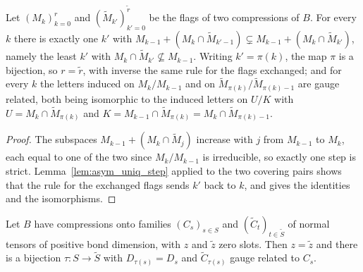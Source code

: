 \begin{lemma}
    \label{prop:asym_uniq_matching}
    \leanok
    Let $(M_k)_{k=0}^r$ and $(\widetilde M_{k'})_{k'=0}^{\widetilde r}$ be the flags of two
    compressions of $B$. For every $k$ there is exactly one $k'$ with
    $M_{k-1}+(M_k\cap\widetilde M_{k'-1})\subsetneq M_{k-1}+(M_k\cap\widetilde M_{k'})$, namely the least
    $k'$ with $M_k\cap\widetilde M_{k'}\not\subseteq M_{k-1}$. Writing $k'=\pi(k)$, the map $\pi$ is a
    bijection, so $r=\widetilde r$, with inverse the same rule for the flags exchanged; and for
    every $k$ the letters induced on $M_k/M_{k-1}$ and on $\widetilde M_{\pi(k)}/\widetilde M_{\pi(k)-1}$
    are gauge related, both being isomorphic to the induced letters on $U/K$ with
    $U=M_k\cap\widetilde M_{\pi(k)}$ and $K=M_{k-1}\cap\widetilde M_{\pi(k)}=M_k\cap\widetilde M_{\pi(k)-1}$.
\end{lemma}

\begin{proof}
    \leanok
    The subspaces $M_{k-1}+(M_k\cap\widetilde M_j)$ increase with $j$ from $M_{k-1}$ to $M_k$, each
    equal to one of the two since $M_k/M_{k-1}$ is irreducible, so exactly one step is strict.
    Lemma~\ref{lem:asym_uniq_step} applied to the two covering pairs shows that the rule for the
    exchanged flags sends $k'$ back to $k$, and gives the identities and the isomorphisms.
\end{proof}

\begin{lemma}
    \label{thm:asym_uniq_blocks}
    \leanok
    Let $B$ have compressions onto families $(C_s)_{s\in S}$ and $(\widetilde C_t)_{t\in\widetilde S}$
    of normal tensors of positive bond dimension, with $z$ and $\widetilde z$ zero slots. Then
    $z=\widetilde z$ and there is a bijection $\tau:S\to\widetilde S$ with $D_{\tau(s)}=D_s$ and
    $\widetilde C_{\tau(s)}$ gauge related to $C_s$.
\end{lemma}

